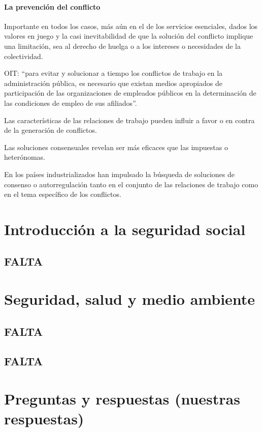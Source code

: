 \documentclass[spanish,12pt,a4paper,titlepage]{report}
\begin{document}
\subsection{La prevención del conflicto}

Importante en todos los casos, más aún en el de los servicios esenciales, dados los valores en juego y la casi inevitabilidad de que la solución del conflicto implique una limitación, sea al derecho de huelga o a los intereses o necesidades de la colectividad.

OIT: ``para evitar y solucionar a tiempo los conflictos de trabajo en la administración pública, es necesario que existan medios apropiados de participación de las organizaciones de empleados públicos en la determinación de las condiciones de empleo de sus afiliados''. 

Las características de las relaciones de trabajo pueden influir a favor o en contra de la generación de conflictos. 

Las soluciones consensuales revelan ser más eficaces que las impuestas o heterónomas.

En los países industrializados han impulsado la búsqueda de soluciones de consenso o autorregulación tanto en el conjunto de las relaciones de trabajo como en el tema específico de los conflictos. 

\part{Introducción a la seguridad social}
\chapter{FALTA}

\part{Seguridad, salud y medio ambiente}
\chapter{FALTA}
\chapter{FALTA}

\part{Preguntas y respuestas (nuestras respuestas)}
\end{document}
